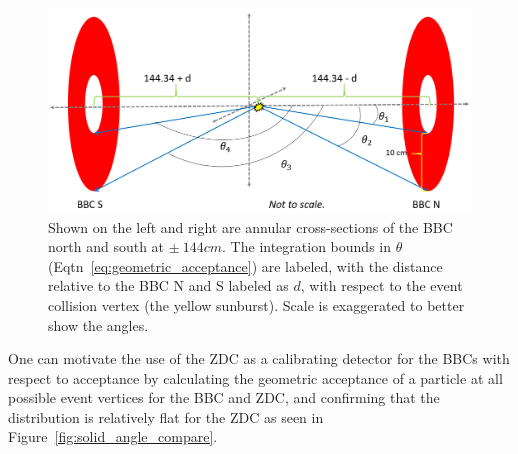 \begin{figure}[hp]
  \centering
  \includegraphics[width=\linewidth]{./figures/geometric_acceptance_noeq.png}
  \caption{
    Shown on the left and right are annular cross-sections of the BBC north and
    south at $\pm~144cm$. The integration bounds in $\theta$
    (Eqtn~\ref{eq:geometric_acceptance}) are labeled, with the distance relative
    to the BBC N and S labeled as $d$, with respect to the event collision
    vertex (the yellow sunburst). Scale is exaggerated to better show the
    angles.
  }
  \label{fig:bbc_geometric_acceptance}
\end{figure}

One can motivate the use of the ZDC as a calibrating detector for the BBCs with
respect to acceptance by calculating the geometric acceptance of a particle at
all possible event vertices for the BBC and ZDC, and confirming that the
distribution is relatively flat for the ZDC as seen in
Figure~\ref{fig:solid_angle_compare}.


